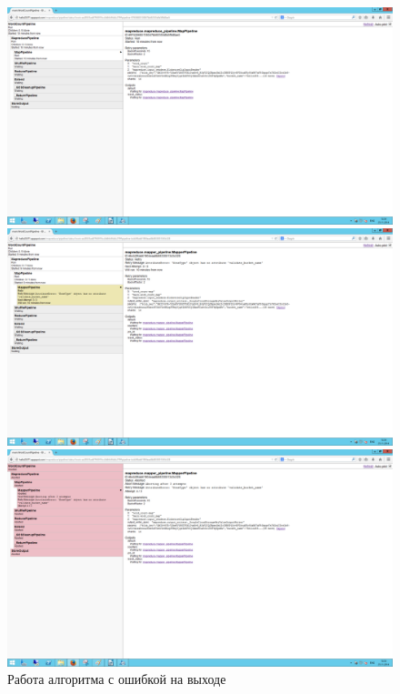 \documentclass[pscyr,10pt]{hedlab}
\begin{document}
  \begin{figure}[h!]
    \center
    \includegraphics[width=.8\textwidth]{08_1} \\[1ex]
    \includegraphics[width=.8\textwidth]{08_2} \\[1ex]
    \includegraphics[width=.8\textwidth]{08_3} \\
    Работа алгоритма с ошибкой на выходе
  \end{figure}
  
  
  
\end{document}
